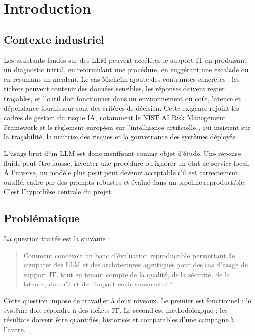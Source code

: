 
\chapter{Introduction}

\section{Contexte industriel}

Les assistants fondés sur des LLM peuvent accélérer le support IT en produisant
un diagnostic initial, en reformulant une procédure, en suggérant une escalade
ou en résumant un incident. Le cas Michelin ajoute des contraintes concrètes :
les tickets peuvent contenir des données sensibles, les réponses doivent rester
traçables, et l'outil doit fonctionner dans un environnement où coût, latence et
dépendance fournisseur sont des critères de décision.
Cette exigence rejoint les cadres de gestion du risque IA, notamment le
NIST AI Risk Management Framework \cite{nistairmf2023} et le règlement européen
sur l'intelligence artificielle \cite{euai2024}, qui insistent sur la
traçabilité, la maîtrise des risques et la gouvernance des systèmes déployés.

L'usage brut d'un LLM est donc insuffisant comme objet d'étude. Une réponse
fluide peut être fausse, inventer une procédure ou ignorer un état de service
local. À l'inverse, un modèle plus petit peut devenir acceptable s'il est
correctement outillé, cadré par des prompts robustes et évalué dans un pipeline
reproductible. C'est l'hypothèse centrale du projet.

\section{Problématique}

La question traitée est la suivante :

\begin{quote}
Comment concevoir un banc d'évaluation reproductible permettant de comparer des
LLM et des architectures agentiques pour des cas d'usage de support IT, tout en
tenant compte de la qualité, de la sécurité, de la latence, du coût et de
l'impact environnemental ?
\end{quote}

Cette question impose de travailler à deux niveaux. Le premier est fonctionnel :
le système doit répondre à des tickets IT. Le second est méthodologique : les
résultats doivent être quantifiés, historisés et comparables d'une campagne à
l'autre.

